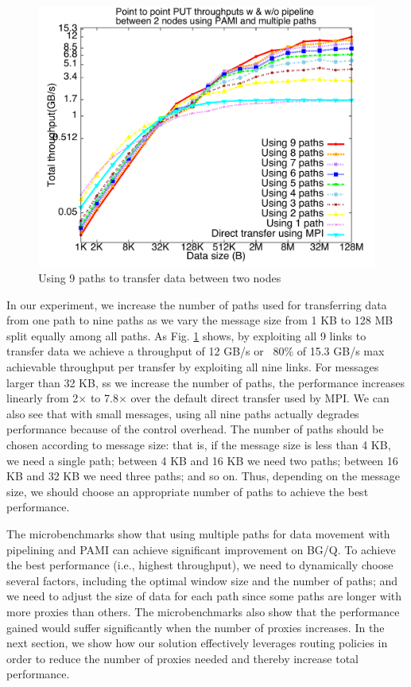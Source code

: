 \documentclass[final,5p,times]{elsarticle}
\begin{document}
\begin{figure}[!htb]
\centering
\includegraphics[scale=0.3]{pami_multipaths.pdf}
\caption{Using 9 paths to transfer data between two nodes}
\label{fig:pipeline_proxies}
\end{figure}

In our experiment, we increase the number of paths used for transferring data from one path to nine paths as we vary the message size from 1 KB to 128 MB split equally among all paths. As Fig. \ref{fig:pipeline_proxies} shows, by exploiting all 9 links to transfer data we achieve a throughput of 12 GB/s  or ~80\% of 15.3 GB/s max achievable throughput per transfer by exploiting all nine links. For messages larger than 32 KB, ss we increase the number of paths, the performance increases linearly from 2$\times$ to 7.8$\times$ over the default direct transfer used by MPI. We can also see that with small messages, using all nine paths actually degrades performance because of the control overhead. The number of paths should be chosen according to message size: that is, if the message size is less than 4 KB, we need a single path; between 4 KB and 16 KB we need two paths; between 16 KB and 32 KB we need three paths; and so on. Thus, depending on the message size, we should choose an appropriate number of paths to achieve the best performance.

The microbenchmarks show that using multiple paths for data movement with pipelining and PAMI can achieve significant improvement on BG/Q. To achieve the best performance (i.e., highest throughput), we need to dynamically choose several factors, including the optimal window size and the number of paths; and we need to adjust the size of data for each path since some paths are longer with more proxies than others. The microbenchmarks also show that the performance gained would suffer significantly when the number of proxies increases. In the next section, we show how our solution effectively leverages routing policies in order  to reduce the number of proxies needed and thereby increase total performance.
\end{document}
